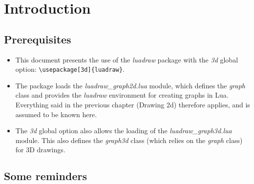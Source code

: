 \section{Introduction}

\subsection{Prerequisites}

\begin{itemize}
    \item This document presents the use of the \emph{luadraw} package with the \emph{3d} global option:
\verb|\usepackage[3d]{luadraw}|.
    \item The package loads the \emph{luadraw\_graph2d.lua} module, which defines the \emph{graph} class and provides the \emph{luadraw} environment for creating graphs in Lua. Everything said in the previous chapter (Drawing 2d) therefore applies, and is assumed to be known here.
    \item The \emph{3d} global option also allows the loading of the \emph{luadraw\_graph3d.lua} module. This also defines the \emph{graph3d} class (which relies on the \emph{graph} class) for 3D drawings.
\end{itemize}

\subsection{Some reminders}

